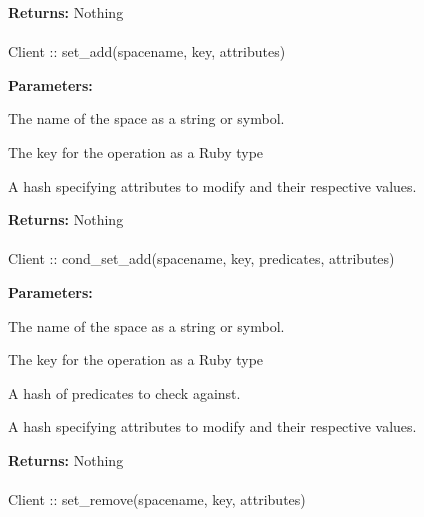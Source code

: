 \noindent\textbf{Returns:}
Nothing

\paragraph{}
\begin{ccode}
Client :: set_add(spacename, key, attributes)
\end{ccode}
\funcdesc 

\noindent\textbf{Parameters:}
\begin{description}[labelindent=\widthof{{attributes}},leftmargin=*,noitemsep,nolistsep,align=right]
\item[spacename] The name of the space as a string or symbol.
\item[key] The key for the operation as a Ruby type
\item[attributes] A hash specifying attributes to modify and their respective values.
\end{description}

\noindent\textbf{Returns:}
Nothing

\paragraph{}
\begin{ccode}
Client :: cond_set_add(spacename, key, predicates, attributes)
\end{ccode}
\funcdesc 

\noindent\textbf{Parameters:}
\begin{description}[labelindent=\widthof{{predicates}},leftmargin=*,noitemsep,nolistsep,align=right]
\item[spacename] The name of the space as a string or symbol.
\item[key] The key for the operation as a Ruby type
\item[predicates] A hash of predicates to check against.
\item[attributes] A hash specifying attributes to modify and their respective values.
\end{description}

\noindent\textbf{Returns:}
Nothing

\paragraph{}
\begin{ccode}
Client :: set_remove(spacename, key, attributes)
\end{ccode}
\funcdesc 

